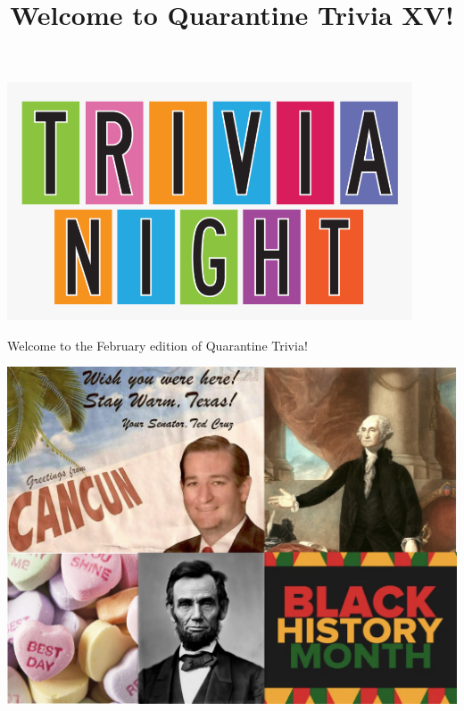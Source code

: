\documentclass[11pt]{beamer}
\begin{document}
\title{Welcome to Quarantine Trivia XV!}
\date{}

\begin{frame}
\titlepage{}
\begin{center}
\includegraphics[max width=0.9\textwidth,
    max height=0.4\textheight]{Images/triviatitleframelogo.png}
\end{center}
\end{frame}

\begin{frame}
Welcome to the February edition of Quarantine Trivia!
\pause
\begin{center}
\includegraphics[max width=\textwidth,max height=\textheight]{Images/feb.jpeg}
\end{center}
\end{frame}
\end{document}
